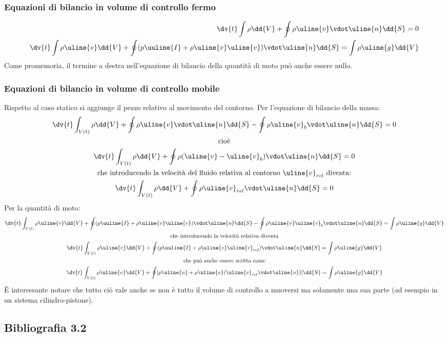 \subsubsection{Equazioni di bilancio in volume di controllo fermo}
	\begin{equation*}
		\begin{aligned}
			\dv{t} \int \rho \dd{V} + \oint \rho \uline{v} \vdot \uline{n} \dd{S} = 0 \\
			\dv{t} \int \rho \uline{v} \dd{V} + \oint (p \uuline{I} + \rho \uline{v} \uline{v}) \vdot \uline{n} \dd{S} = \int \rho \uline{g} \dd{V}
		\end{aligned}
	\end{equation*}
Come promemoria, il termine a destra nell'equazione di bilancio della quantità di moto può anche essere nullo.
%
\subsubsection{Equazioni di bilancio in volume di controllo mobile}
Rispetto al caso statico si aggiunge il pezzo relativo al movimento del contorno.
Per l'equazione di bilancio della massa:
%
	\begin{equation*}
		\begin{gathered}
			\dv{t} \int_{V(t)} \rho \dd{V} + \oint \rho \uline{v} \vdot \uline{n} \dd{S} - \oint \rho \uline{v}_b \vdot \uline{n} \dd{S} = 0 \\
			\text{cioè} \\
			\dv{t} \int_{V(t)} \rho \dd{V} + \oint \rho (\uline{v}- \uline{v}_b) \vdot \uline{n} \dd{S} = 0 \\
			\text{che introducendo la velocità del fluido relativa al contorno $\uline{v}_{rel}$ diventa:} \\
			\dv{t} \int_{V(t)} \rho \dd{V} + \oint \rho \uline{v}_{rel} \vdot \uline{n} \dd{S} = 0
		\end{gathered}
	\end{equation*}
%
Per la quantità di moto:
%
	\begin{equation*}
		\begin{gathered}
			\dv{t} \int_{V(t)} \rho \uline{v} \dd{V} + \oint (p \uuline{I} + \rho \uline{v} \uline{v}) \vdot \uline{n} \dd{S} - \oint \rho \uline{v} \uline{v}_b \vdot \uline{n} \dd{S} = \int \rho \uline{g} \dd{V} \\
			\text{che introducendo la velocità relativa diventa} \\
			\dv{t} \int_{V(t)} \rho \uline{v} \dd{V} + \oint (p \uuline{I} + \rho \uline{v} \uline{v}_{rel}) \vdot \uline{n} \dd{S} = \int \rho \uline{g} \dd{V}\\
			\text{che può anche essere scritta come}\\
			\dv{t} \int_{V(t)} \rho \uline{v} \dd{V} + \oint [p \uline{n} + \rho \uline{v} (\uline{v}_{rel} \vdot \uline{n})]  \dd{S} = \int \rho \uline{g} \dd{V}
		\end{gathered}
	\end{equation*}
È interessante notare che tutto ciò vale anche se non è tutto il volume di controllo a muoversi ma solamente una sua parte (ad esempio in un sistema cilindro-pistone).

\subsection*{Bibliografia 3.2}
\cite[Cap.\ 4.5, 5.1, 5.2]{CengelCimbala}\\
\cite[Cap.\ 4.1, 4.2, 4.3]{PnueliGutfinger}
